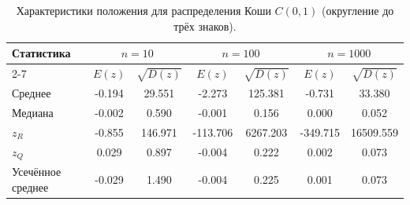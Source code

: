 \begin{table}[H]
\centering
\small
\begin{tabular}{|l|cc|cc|cc|}
\hline
\multirow{2}{*}{Статистика} & \multicolumn{2}{c|}{$n=10$} & \multicolumn{2}{c|}{$n=100$} & \multicolumn{2}{c|}{$n=1000$} \\
\cline{2-7}
 & $E(z)$ & $\sqrt{D(z)}$ & $E(z)$ & $\sqrt{D(z)}$ & $E(z)$ & $\sqrt{D(z)}$ \\
\hline
Среднее & -0.194 & 29.551 & -2.273 & 125.381 & -0.731 & 33.380 \\
\hline
Медиана & -0.002 & 0.590 & -0.001 & 0.156 & 0.000 & 0.052 \\
\hline
$z_R$ & -0.855 & 146.971 & -113.706 & 6267.203 & -349.715 & 16509.559 \\
\hline
$z_Q$ & 0.029 & 0.897 & -0.004 & 0.222 & 0.002 & 0.073 \\
\hline
Усечённое среднее & -0.029 & 1.490 & -0.004 & 0.225 & 0.001 & 0.073 \\
\hline
\end{tabular}
\caption{Характеристики положения для распределения Коши $C(0,1)$ (округление до трёх знаков).}
\label{tab:cauchy_rounded}
\end{table}